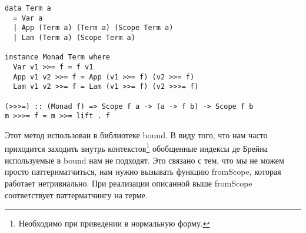 \begin{lstlisting}
data Term a
  = Var a
  | App (Term a) (Term a) (Scope Term a)
  | Lam (Term a) (Scope Term a)

instance Monad Term where
  Var v1 >>= f = f v1
  App v1 v2 >>= f = App (v1 >>= f) (v2 >>= f)
  Lam v1 v2 >>= f = Lam (v1 >>= f) (v2 >>>= f)

(>>>=) :: (Monad f) => Scope f a -> (a -> f b) -> Scope f b
m >>>= f = m >>= lift . f

\end{lstlisting}

Этот метод использован в библиотеке bound\cite{bound}. В виду того, что нам часто приходится заходить внутрь контекстов\footnote{Необходимо при приведении в нормальную форму.} обобщенные индексы де Брейна используемые в bound нам не подходят. Это связано с тем, что мы не можем просто паттернматчиться, нам нужно вызывать функцию fromScope, которая работает нетривиально. При реализации описанной выше fromScope соответствует паттерматчингу на терме.
